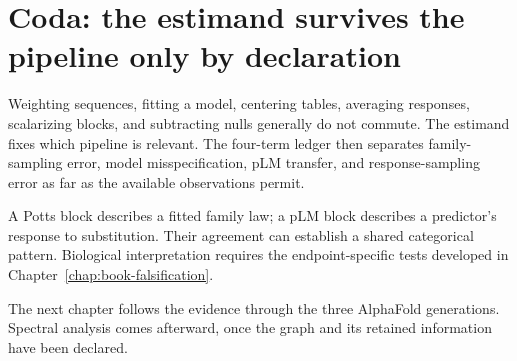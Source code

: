 \section*{Coda: the estimand survives the pipeline only by declaration}

Weighting sequences, fitting a model, centering tables, averaging responses, scalarizing blocks,
and subtracting nulls generally do not commute.  The estimand fixes which pipeline is relevant.
The four-term ledger then separates family-sampling error, model misspecification, pLM transfer,
and response-sampling error as far as the available observations permit.

A Potts block describes a fitted family law; a pLM block describes a predictor's response to
substitution.  Their agreement can establish a shared categorical pattern.  Biological
interpretation requires the endpoint-specific tests developed in
Chapter~\ref{chap:book-falsification}.

The next chapter follows the evidence through the three AlphaFold generations.  Spectral
analysis comes afterward, once the graph and its retained information have been declared.
